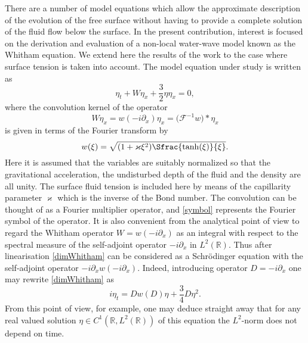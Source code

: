 There are a number of model equations which
allow the approximate description of the evolution of the free surface
without having to provide a complete solution of the fluid flow
below the surface.
%
In the present contribution, interest is focused on the derivation and evaluation of
a non-local water-wave model known as the Whitham equation.
We extend here the results of the work \cite{Moldabayev2015}
to the case where surface tension is taken into account.
The model equation under study is written as
%
\begin{equation}
\label{dimWhitham}
	\eta_t + W \eta_x + \frac 32 \eta \eta_x = 0
	,
\end{equation}
%
where the convolution kernel of the operator
\[
	W \eta_x = w(-i \partial _x) \eta_x
	= \big( {\mathcal F}^{-1} w \big) * \eta_x
\]	
is given in terms of the Fourier transform by
%
\begin{equation}
\label{symbol}
	w(\xi) = \sqrt{ ( 1 + \varkappa \xi^2 ) \Sfrac{ \tanh(\xi) }{ \xi }}.
\end{equation}
%
Here it is assumed that the variables are suitably normalized so that
the gravitational acceleration, the undisturbed depth of the fluid
and the density are all unity.
The surface fluid tension is included here by means of the
capillarity parameter $\varkappa$ which is the inverse of the Bond number.
The convolution can be thought of as a Fourier multiplier operator,
and \eqref{symbol} represents the Fourier symbol of the operator. 
It is also convenient from the analytical point of view to
regard the Whitham operator $W = w(-i \partial _x)$
as an integral with respect to the spectral measure
of the self-adjoint operator $-i \partial _x$ in $L^2( \mathbb R )$.
Thus after linearisation \eqref{dimWhitham} can be considered
as a Schr\"odinger equation with the self-adjoint operator
$-i \partial _x w(-i \partial _x)$.
Indeed, introducing operator $D = -i \partial _x$ one may
rewrite \eqref{dimWhitham} as
%
\[
	i \eta_t = D w(D) \eta + \frac 34 D \eta^2
	.
\]
%
From this point of view, for example, one may deduce straight away that for any
real valued solution $\eta \in C^1( \mathbb R, L^2( \mathbb R ) )$
of this equation the $L^2$-norm does not depend on time.


